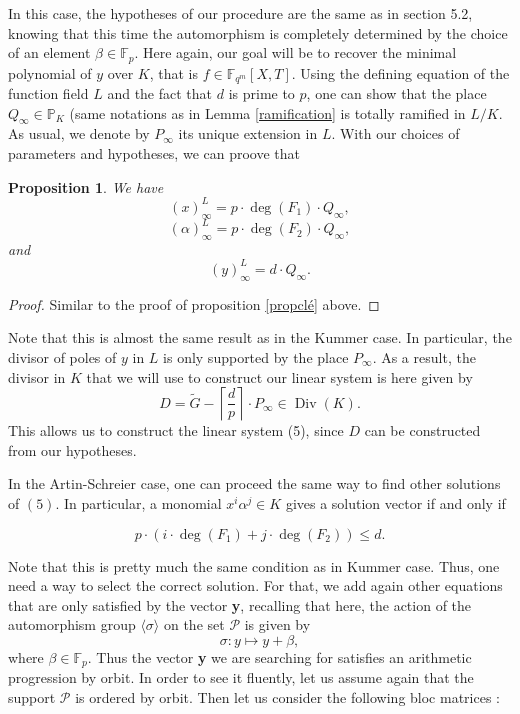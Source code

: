 \documentclass[10pt]{article}
\newtheorem{prop1}[thm]{Proposition}
\newcommand{\s}{\vspace{0.3cm}}
\newcommand{\cd}{\cdot}
\newcommand{\PP}{\mathbb{P}}
\newcommand{\fqm}{\mathbb{F}_{q^m}}
\newcommand{\PR}{\mathcal{P}}
\newcommand{\Div}{\operatorname{Div}}
\begin{document}
\s

In this case, the hypotheses of our procedure are the same as in section 5.2, knowing that this time the automorphism is completely determined by the choice of an element $\beta \in \mathbb{F}_p$. Here again, our goal will be to recover the minimal polynomial of $y$ over $K$, that is $f \in \fqm[X,T]$. Using the defining equation of the function field $L$ and the fact that $d$ is prime to $p$, one can show that the place $Q_{\infty} \in \PP_K$ (same notations as in Lemma \ref{ramification} is totally ramified in $L/K$. As usual, we denote by $P_{\infty}$ its unique extension in $L$. With our choices of parameters and hypotheses, we can proove that

\s

\begin{prop1} \label{propclé2}
We have
\[(x)^L_{\infty} = p \cd \deg(F_1) \cd Q_{\infty},\]
\[(\alpha)^L_{\infty} = p \cd \deg(F_2) \cd Q_{\infty},\]
and
\[(y)^L_{\infty} = d \cd Q_{\infty}.\]
\end{prop1}

\s

\begin{proof}
Similar to the proof of proposition \ref{propclé} above.
\end{proof}

\s

Note that this is almost the same result as in the Kummer case. In particular, the divisor of poles of $y$ in $L$ is only supported by the place $P_{\infty}$. As a result, the divisor in $K$ that we will use to construct our linear system is here given by 
\[D = \tilde{G} - \left\lceil\frac{d}{p}\right\rceil \cd P_{\infty} \in \Div(K).\]
This allows us to construct the linear system (5), since $D$ can be constructed from our hypotheses. 

\s

In the Artin-Schreier case, one can proceed the same way to find other solutions of $(5)$. In particular, a monomial $x^i\alpha^j \in K$ gives a solution vector if and only if 

\[p \cd (i \cd \deg(F_1)+j \cd \deg(F_2)) \leq d.\]

Note that this is pretty much the same condition as in Kummer case. Thus, one need a way to select the correct solution. For that, we add again other equations that are only satisfied by the vector \textbf{y}, recalling that here, the action of the automorphism group $\langle\sigma\rangle$ on the set $\PR$ is given by 
\[\sigma : y \longmapsto y + \beta,\]
where $\beta \in \mathbb{F}_p$. Thus the vector \textbf{y} we are searching for satisfies an arithmetic progression by orbit. In order to see it fluently, let us assume again that the support $\PR$ is ordered by orbit. Then let us consider the following bloc matrices :
\end{document}
